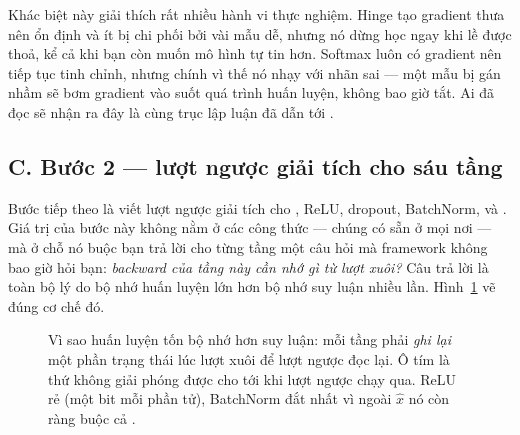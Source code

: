 \documentclass[../../../deep_learning.tex]{subfiles}
\begin{document}
Khác biệt này giải thích rất nhiều hành vi thực nghiệm. Hinge tạo gradient thưa nên ổn định và ít bị chi phối bởi vài mẫu dễ, nhưng nó dừng học ngay khi lề được thoả, kể cả khi bạn còn muốn mô hình tự tin hơn. Softmax luôn có gradient nên tiếp tục tinh chỉnh, nhưng chính vì thế nó nhạy với nhãn sai --- một mẫu bị gán nhầm sẽ bơm gradient vào suốt quá trình huấn luyện, không bao giờ tắt. Ai đã đọc  sẽ nhận ra đây là cùng trục lập luận đã dẫn tới .


\subsection{C. Bước 2 --- lượt ngược giải tích cho sáu tầng}
Bước tiếp theo là viết lượt ngược giải tích cho , ReLU, dropout, BatchNorm,  và . Giá trị của bước này không nằm ở các công thức --- chúng có sẵn ở mọi nơi --- mà ở chỗ nó buộc bạn trả lời cho từng tầng một câu hỏi mà framework không bao giờ hỏi bạn: \emph{backward của tầng này cần nhớ gì từ lượt xuôi?} Câu trả lời là toàn bộ lý do bộ nhớ huấn luyện lớn hơn bộ nhớ suy luận nhiều lần. Hình~\ref{fig:bang-ghi-forward} vẽ đúng cơ chế đó.

\begin{figure}[H]\centering
{}
\caption{Vì sao huấn luyện tốn bộ nhớ hơn suy luận: mỗi tầng phải \emph{ghi lại} một phần trạng thái lúc lượt xuôi để lượt ngược đọc lại. Ô tím là thứ không giải phóng được cho tới khi lượt ngược chạy qua. ReLU rẻ (một bit mỗi phần tử), BatchNorm đắt nhất vì ngoài $\hat{x}$ nó còn ràng buộc cả .}
\label{fig:bang-ghi-forward}
\end{figure}
\end{document}
